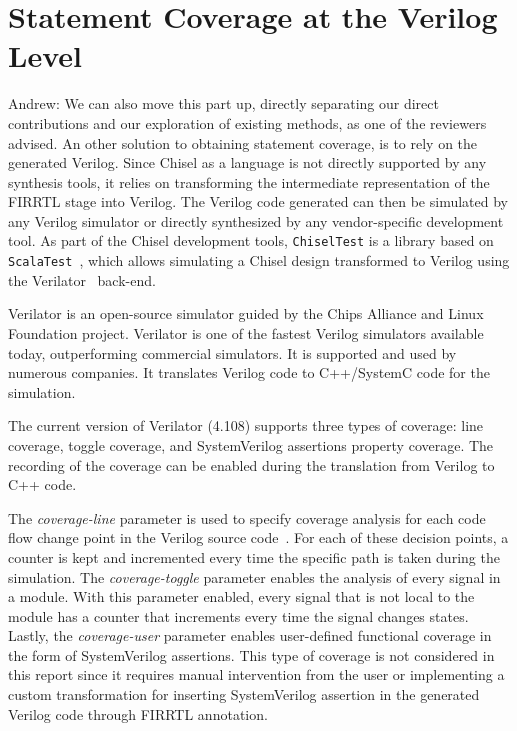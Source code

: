 \documentclass[runningheads]{llncs}
\newcommand{\andrew}[1]{{\color{red} Andrew: #1}}
\begin{document}
\section{Statement Coverage at the Verilog Level}
\andrew{We can also move this part up, directly separating our direct contributions and our exploration of existing methods, as one of the reviewers advised.}
An other solution to obtaining statement coverage, is to rely on the generated Verilog. Since Chisel as a language is not directly supported by any synthesis tools, it relies on transforming the intermediate representation of the FIRRTL stage into Verilog. The Verilog code generated can then be simulated by any Verilog simulator or directly synthesized by any vendor-specific development tool. As part of the Chisel development tools, \texttt{ChiselTest} is a library based on \texttt{ScalaTest}~\cite{ScalaTest}, which allows simulating a Chisel design transformed to Verilog using the Verilator~\cite{verilator} back-end.

Verilator is an open-source simulator guided by the Chips Alliance and Linux Foundation project. Verilator is one of the fastest Verilog simulators available today, outperforming commercial simulators. It is supported and used by numerous companies. It translates Verilog code to C++/SystemC code for the simulation.

The current version of Verilator (4.108) supports three types of coverage: line coverage, toggle coverage, and SystemVerilog assertions property coverage. The recording of the coverage can be enabled during the translation from Verilog to C++ code.

The \textit{coverage-line} parameter is used to specify coverage analysis for each code flow change point in the Verilog source code~\cite{verilatormanual}. For each of these decision points, a counter is kept and incremented every time the specific path is taken during the simulation. The \textit{coverage-toggle} parameter enables the analysis of every signal in a module. With this parameter enabled, every signal that is not local to the module has a counter that increments every time the signal changes states. Lastly, the \textit{coverage-user} parameter enables user-defined functional coverage in the form of SystemVerilog assertions. This type of coverage is not considered in this report since it requires manual intervention from the user or implementing a custom transformation for inserting SystemVerilog assertion in the generated Verilog code through FIRRTL annotation.
\end{document}
